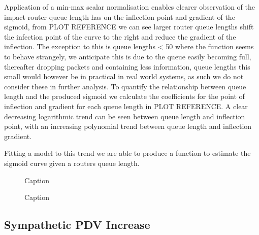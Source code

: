 Application of a min-max scalar normalisation enables clearer observation of the impact router queue length has on the inflection point and gradient of the sigmoid, from PLOT REFERENCE we can see larger router queue lengths shift the infection point of the curve to the right and reduce the gradient of the inflection. The exception to this is queue lengths < 50 where the function seems to behave strangely, we anticipate this is due to the queue easily becoming full, thereafter dropping packets and containing less information, queue lengths this small would however be in practical in real world systems, as such we do not consider these in further analysis. To quantify the relationship between queue length and the produced sigmoid we calculate the coefficients for the point of inflection and gradient for each queue length in PLOT REFERENCE. A clear decreasing logarithmic trend can be seen between queue length and inflection point, with an increasing polynomial trend between queue length and inflection gradient.\par
Fitting a model to this trend we are able to produce a function to estimate the sigmoid curve given a routers queue length.
\begin{figure}[H]
    \centering
    \caption{Caption}
    \label{fig:Rsigmoidcoefs}
\end{figure}

\begin{figure}[H]
    \centering
    \caption{Caption}
    \label{fig:Rvariedqlenpdv}
\end{figure}

\subsection{Sympathetic PDV Increase}
\label{ssec:Rsympathicpdv}

